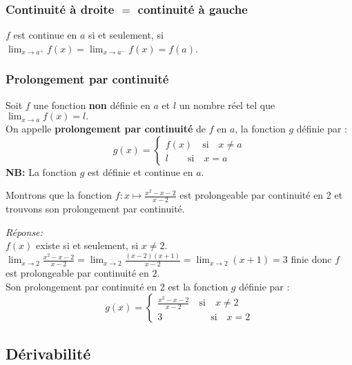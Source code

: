 \subsubsection*{ Continuité à droite $=$ continuité à gauche}
\begin{property}
$ f $ est continue en $ a $ si et seulement, si  $\displaystyle \lim_{x \to a^{+}}f(x)=\displaystyle\lim_{x \to a^{-}}f(x)=f(a) $. 
\end{property}
\subsubsection*{Prolongement par continuité}
\begin{definition}
Soit $ f $ une fonction  \textbf{non}  définie en $ a $ et $ l $ un nombre réel tel que $ \displaystyle\lim_{x \to a}f(x)=l. $\\
On appelle \textbf{prolongement par continuité } de $ f $ en $ a $, la fonction $ g $ définie par :
\[ g (x)=\left\{\begin{array}{l} f(x)\quad \textrm{si} \quad x\neq a \\ l                      \quad \quad \textrm{si}\quad x= a  \end{array} \right.\]
\textbf{NB:} La fonction $ g $ est définie et continue en $ a $.
\end{definition}
\begin{example}
Montrons que la fonction $ f: x \mapsto \frac{x^{2}-x-2}{x-2} $   est prolongeable par continuité en 2 et trouvons son prolongement par continuité.
\end{example}

\textsl{Réponse:}\\
$ f(x) $ existe si et seulement, si $ x\neq 2 $.\\  $\displaystyle\lim_{x \to 2 }\frac{x^{2}-x-2}{x-2}=\displaystyle\lim_{x \to 2 }\frac{(x-2)(x+1)}{x-2}= \displaystyle\lim_{x \to 2 }(x+1)=3 $   finie donc $ f $ est prolongeable par continuité en $ 2. $\\
Son prolongement par continuité en $ 2$ est la fonction $ g $ définie par : 
\[ g (x)=\left\{\begin{array}{l} \frac{x^{2}-x-2}{x-2} \quad \textrm{si} \quad x\neq 2 \\ 3\quad \quad \qquad \quad  \textrm{si}\quad x= 2  \end{array} \right.\]

\subsection{Dérivabilité}
